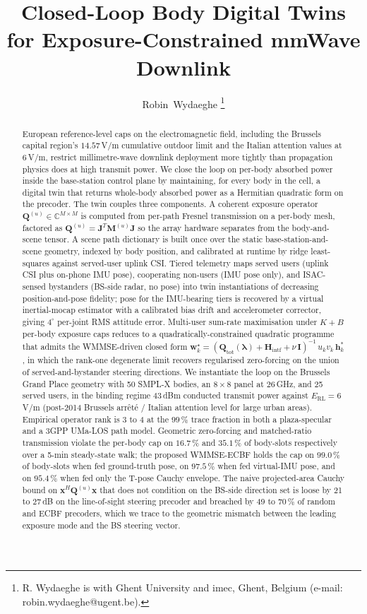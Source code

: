 \documentclass[journal,twocolumn,10pt]{IEEEtran}
\title{Closed-Loop Body Digital Twins for Exposure-Constrained mmWave Downlink}
\author{Robin~Wydaeghe%
  \thanks{R. Wydaeghe is with Ghent University and imec, Ghent, Belgium
  (e-mail: robin.wydaeghe@ugent.be).}}
\theoremstyle{plain}
\theoremstyle{remark}
\newcommand{\xx}{\mathbf{x}}
\newcommand{\hh}{\mathbf{h}}
\newcommand{\ww}{\mathbf{w}}
\newcommand{\Qmat}{\mathbf{Q}}
\newcommand{\Mmat}{\mathbf{M}}
\newcommand{\Hintf}{\mathbf{H}_{\mathrm{intf}}}
\newcommand{\Jmat}{\mathbf{J}}
\newcommand{\Complex}{\mathbb{C}}
\begin{document}
\maketitle

\begin{abstract}
European reference-level caps on the electromagnetic field, including
the Brussels capital region's $14.57\,$V/m cumulative outdoor limit
and the Italian attention values at $6\,$V/m, restrict
millimetre-wave downlink deployment more tightly than propagation
physics does at high transmit power. We close the loop on per-body
absorbed power inside the base-station control plane by maintaining,
for every body in the cell, a digital twin that returns whole-body
absorbed power as a Hermitian quadratic form on the precoder. The
twin couples three components. A coherent exposure operator
$\Qmat^{(u)} \in \Complex^{M\times M}$ is computed from per-path
Fresnel transmission on a per-body mesh, factored as $\Qmat^{(u)}
= \Jmat^T \Mmat^{(u)} \Jmat$ so the array hardware separates from the
body-and-scene tensor. A scene path dictionary is built once over the
static base-station-and-scene geometry, indexed by body position, and
calibrated at runtime by ridge least-squares against served-user
uplink CSI. Tiered telemetry maps served users (uplink CSI plus
on-phone IMU pose), cooperating non-users (IMU pose only), and
ISAC-sensed bystanders (BS-side radar, no pose) into twin
instantiations of decreasing position-and-pose fidelity; pose for
the IMU-bearing tiers is recovered by a virtual inertial-mocap
estimator with a calibrated bias drift and accelerometer corrector,
giving $4^\circ$ per-joint RMS attitude error. Multi-user sum-rate
maximisation under $K + B$ per-body exposure caps reduces to a
quadratically-constrained quadratic programme that admits the
WMMSE-driven closed form
$\ww_k^\star = (\Qmat_{\mathrm{tot}}(\bm\lambda) + \Hintf +
\nu\,\mathbf{I})^{-1}\,u_k v_k\,\hh_k^*$, in which the rank-one
degenerate limit recovers regularised zero-forcing on the union of
served-and-bystander steering directions. We instantiate the loop on
the Brussels Grand Place geometry with 50 SMPL-X bodies, an
$8 \times 8$ panel at $26\,$GHz, and 25 served users, in the binding
regime $43\,$dBm conducted transmit power against $E_{\mathrm{RL}} =
6\,$V/m (post-2014 Brussels arr\^et\'e / Italian attention level for
large urban areas). Empirical operator rank is 3 to 4 at the
$99\,\%$ trace fraction in both a plaza-specular and a 3GPP UMa-LOS
path model. Geometric zero-forcing and matched-ratio transmission
violate the per-body cap on $16.7\,\%$ and $35.1\,\%$ of body-slots
respectively over a 5-min steady-state walk; the proposed
WMMSE-ECBF holds the cap on $99.0\,\%$ of body-slots when fed
ground-truth pose, on $97.5\,\%$ when fed virtual-IMU pose, and on
$95.4\,\%$ when fed only the T-pose Cauchy envelope. The naive
projected-area Cauchy bound on $\xx^H \Qmat^{(u)} \xx$ that does not
condition on the BS-side direction set is loose by 21 to $27\,$dB on
the line-of-sight steering precoder and breached by 49 to $70\,\%$
of random and ECBF precoders, which we trace to the geometric
mismatch between the leading exposure mode and the BS steering vector.
\end{abstract}
\end{document}
